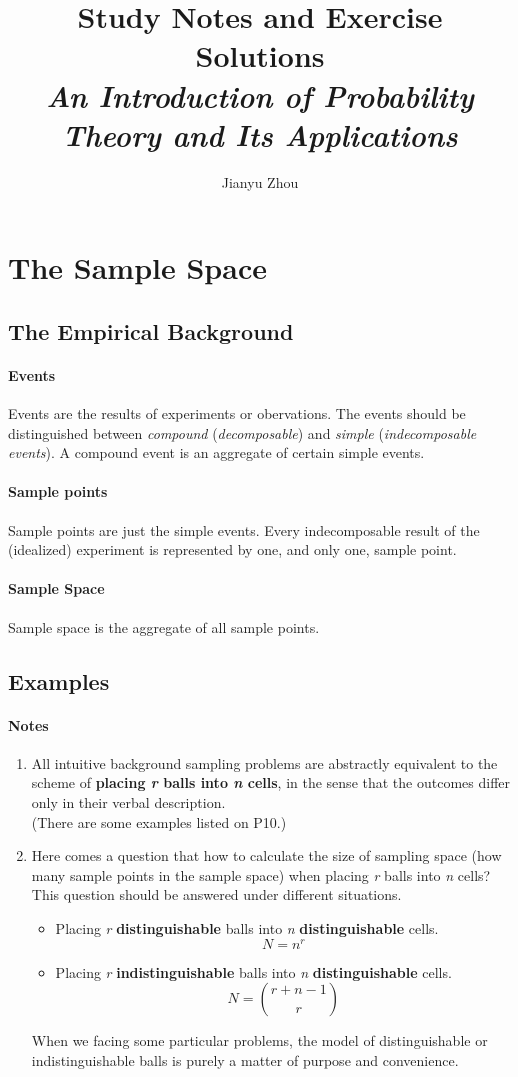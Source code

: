 \documentclass{article}
\author{Jianyu Zhou}
\title{\textbf{Study Notes and Exercise Solutions}\\ \textit{An Introduction of Probability Theory and Its Applications}}
\numberwithin{equation}{subsection}
\begin{document}
	\maketitle
	\tableofcontents
	\newpage
	\section{The Sample Space}
		\subsection{The Empirical Background}
			\paragraph{Events} Events are the results of experiments or obervations. The events should be distinguished between \textit{compound} (\textit{decomposable}) and \textit{simple} (\textit{indecomposable events}). A compound event is an aggregate of certain simple events.
			\paragraph{Sample points} Sample points are just the simple events. Every indecomposable result of the (idealized) experiment is represented by one, and only one, sample point.
			\paragraph{Sample Space} Sample space is the aggregate of all sample points.
		\subsection{Examples}
			\paragraph{Notes} 
			\begin{enumerate} 
			\item All intuitive background sampling problems are abstractly equivalent to the scheme of \textbf{placing \textit{r} balls into \textit{n} cells}, in the sense that the outcomes differ only in their verbal description. \\(There are some examples listed on P10.)
			\item Here comes a question that how to calculate the size of sampling space (how many sample points in the sample space) when placing \textit{r} balls into \textit{n} cells? This question should be answered under different situations.
				\begin{itemize}
				\item Placing \textit{r} \textbf{distinguishable} balls into \textit{n} \textbf{distinguishable} cells. \\ $$N=n^r$$
				\item Placing \textit{r} \textbf{indistinguishable} balls into \textit{n} \textbf{distinguishable} cells. \\ $$N= {r+n-1 \choose r}$$
				\end{itemize}
			When we facing some particular problems, the model of distinguishable or indistinguishable balls is purely a matter of purpose and convenience.
			\end{enumerate}
\end{document}
